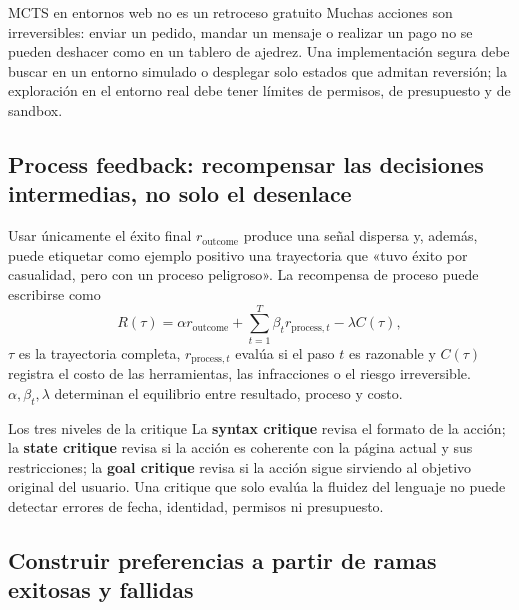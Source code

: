 
\begin{warningbox}{MCTS en entornos web no es un retroceso gratuito}
Muchas acciones son irreversibles: enviar un pedido, mandar un mensaje o realizar un pago no se pueden deshacer como en un tablero de ajedrez. Una implementación segura debe buscar en un entorno simulado o desplegar solo estados que admitan reversión; la exploración en el entorno real debe tener límites de permisos, de presupuesto y de sandbox.
\end{warningbox}

\subsection{Process feedback: recompensar las decisiones intermedias, no solo el desenlace}

Usar únicamente el éxito final $r_{\text{outcome}}$ produce una señal dispersa y, además, puede etiquetar como ejemplo positivo una trayectoria que «tuvo éxito por casualidad, pero con un proceso peligroso». La recompensa de proceso puede escribirse como
\[
R(\tau)=\alpha r_{\text{outcome}}+
\sum_{t=1}^{T}\beta_t r_{\text{process},t}-\lambda C(\tau),
\]
$\tau$ es la trayectoria completa, $r_{\text{process},t}$ evalúa si el paso $t$ es razonable y $C(\tau)$ registra el costo de las herramientas, las infracciones o el riesgo irreversible. $\alpha,\beta_t,\lambda$ determinan el equilibrio entre resultado, proceso y costo.


\begin{knowledgebox}{Los tres niveles de la critique}
La \textbf{syntax critique} revisa el formato de la acción; la \textbf{state critique} revisa si la acción es coherente con la página actual y sus restricciones; la \textbf{goal critique} revisa si la acción sigue sirviendo al objetivo original del usuario. Una critique que solo evalúa la fluidez del lenguaje no puede detectar errores de fecha, identidad, permisos ni presupuesto.
\end{knowledgebox}

\subsection{Construir preferencias a partir de ramas exitosas y fallidas}

